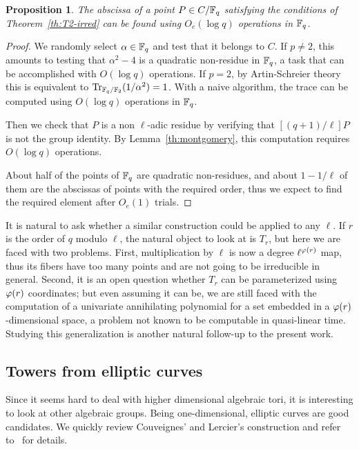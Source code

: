 \documentclass{sig-alternate}
\newtheorem{proposition}[definition]{Proposition}
\begin{document}
\begin{proposition}
  The abscissa of a point $P\in C/\mathbb{F}_q$ satisfying the
  conditions of Theorem~\ref{th:T2-irred} can be found using $O_e(\log
  q)$ operations in $\mathbb{F}_q$.
\end{proposition}
\begin{proof}
  We randomly select $\alpha\in\mathbb{F}_q$ and test that it belongs to
  $C$. If $p\ne2$, this amounts to testing that $\alpha^2-4$ is a
  quadratic non-residue in $\mathbb{F}_q$, a task that can be accomplished
  with $O(\log q)$ operations. If $p=2$, by Artin-Schreier theory
  this is equivalent to $\operatorname{Tr}_{\mathbb{F}_q/\mathbb{F}_2}(1/\alpha^2)=1$. With a
  naive algorithm, the trace can be computed using $O(\log q)$
  operations in $\mathbb{F}_q$.

  Then we check that $P$ is a non $\ell$-adic residue by verifying
  that $[(q+1)/\ell]P$ is not the group identity. By
  Lemma~\ref{th:montgomery}, this computation requires $O(\log q)$
  operations.

  About half of the points of $\mathbb{F}_q$ are quadratic non-residues, and
  about $1-1/\ell$ of them are the abscissas of points with the
  required order, thus we expect to find the required element after
  $O_e(1)$ trials.
\end{proof}

It is natural to ask whether a similar construction could be applied
to any $\ell$. If $r$ is the order of $q$ modulo $\ell$, the natural
object to look at is $T_r$, but here we are faced with two
problems. First, multiplication by $\ell$ is now a degree
$\ell^{\varphi(r)}$ map, thus its fibers have too many points and are
not going to be irreducible in general. Second, it is an open question
whether $T_r$ can be parameterized using $\varphi(r)$ coordinates; but
even assuming it can be, we are still faced with the computation of a
univariate annihilating polynomial for a set embedded in a
$\varphi(r)$-dimensional space, a problem not known to be computable in
quasi-linear time. Studying this generalization is another natural
follow-up to the present work.


\subsection{Towers from elliptic curves}

Since it seems hard to deal with higher dimensional algebraic tori, it
is interesting to look at other algebraic groups. Being
one-dimensional, elliptic curves are good candidates. We quickly
review Couveignes' and Lercier's construction and refer
to~\cite{couveignes+lercier11} for details.
\end{document}
